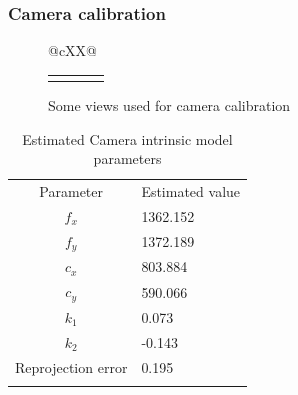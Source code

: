 \documentclass[9pt]{beamer}
\begin{document}
\begin{frame}
\frametitle{Camera calibration}
\begin{figure}   
\begin{tabularx}{\linewidth}{@{}cXX@{}}  
\begin{tabular}{c c c c}  
\hspace{-0.5cm}\subfloat[]{\texttt{[image: ../Thesis\_work/Latex\_thesis\_work/img\_source/cam\_1.png]}} &  
\hspace{-0.3cm}\subfloat[]{\texttt{[image: ../Thesis\_work/Latex\_thesis\_work/img\_source/cam\_2.png]}} &  
\hspace{-0.3cm}\subfloat[]{\texttt{[image: ../Thesis\_work/Latex\_thesis\_work/img\_source/cam\_3.png]}} &  
\hspace{-0.3cm}\subfloat[]{\texttt{[image: ../Thesis\_work/Latex\_thesis\_work/img\_source/cam\_4.png]}}\\  
\end{tabular}  
\end{tabularx}  
\caption{Some views used for camera calibration}  
\label{fig:cam_calib_views}
\end{figure}  
\vspace{-0.5cm}
\begin{table}[ht]  
\centering  
\begin{tabular}{c l}  
\hline\noalign{\smallskip}  
Parameter & Estimated value \\  
\noalign{\smallskip}\hline\noalign{\smallskip}  
$f_x$ & 1362.152\\  
$f_y$ & 1372.189\\  
$c_x$ & 803.884\\  
$c_y$ & 590.066\\  
$k_1$ & 0.073\\  
$k_2$ & -0.143\\   
Reprojection error & 0.195 \\  
\noalign{\smallskip}\hline  
\end{tabular}  
\caption{Estimated Camera intrinsic model parameters}  
\end{table}  
\end{frame}
\end{document}
